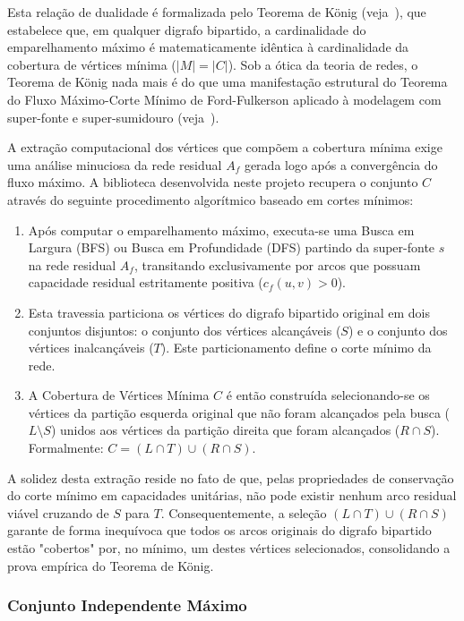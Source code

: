 \documentclass[12pt,a4paper]{article}
\begin{document}
\begin{enumerate}
Esta relação de dualidade é formalizada pelo Teorema de König (veja~\cite{korte2018combinatorial}), que estabelece que, em qualquer digrafo bipartido, a cardinalidade do emparelhamento máximo é matematicamente idêntica à cardinalidade da cobertura de vértices mínima ($|M| = |C|$). Sob a ótica da teoria de redes, o Teorema de König nada mais é do que uma manifestação estrutural do Teorema do Fluxo Máximo-Corte Mínimo de Ford-Fulkerson aplicado à modelagem com super-fonte e super-sumidouro (veja~\cite{ahuja1993network}).

A extração computacional dos vértices que compõem a cobertura mínima exige uma análise minuciosa da rede residual $A_f$ gerada logo após a convergência do fluxo máximo. A biblioteca desenvolvida neste projeto recupera o conjunto $C$ através do seguinte procedimento algorítmico baseado em cortes mínimos:

\begin{enumerate}
    \item Após computar o emparelhamento máximo, executa-se uma Busca em Largura (BFS) ou Busca em Profundidade (DFS) partindo da super-fonte $s$ na rede residual $A_f$, transitando exclusivamente por arcos que possuam capacidade residual estritamente positiva ($c_f(u,v) > 0$).
    \item Esta travessia particiona os vértices do digrafo bipartido original em dois conjuntos disjuntos: o conjunto dos vértices alcançáveis ($S$) e o conjunto dos vértices inalcançáveis ($T$). Este particionamento define o corte mínimo da rede.
    \item A Cobertura de Vértices Mínima $C$ é então construída selecionando-se os vértices da partição esquerda original que não foram alcançados pela busca ($L \setminus S$) unidos aos vértices da partição direita que foram alcançados ($R \cap S$). Formalmente: $C = (L \cap T) \cup (R \cap S)$.
\end{enumerate}

A solidez desta extração reside no fato de que, pelas propriedades de conservação do corte mínimo em capacidades unitárias, não pode existir nenhum arco residual viável cruzando de $S$ para $T$. Consequentemente, a seleção $(L \cap T) \cup (R \cap S)$ garante de forma inequívoca que todos os arcos originais do digrafo bipartido estão "cobertos" por, no mínimo, um destes vértices selecionados, consolidando a prova empírica do Teorema de König.

\subsubsection{Conjunto Independente Máximo}


\end{enumerate}
\end{document}
